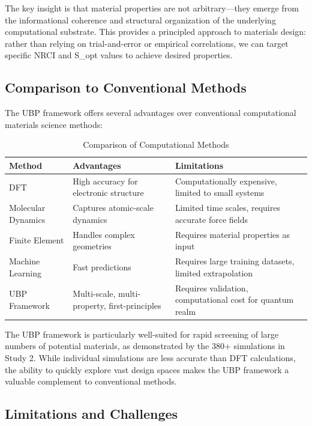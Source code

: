 \documentclass[11pt,a4paper]{article}
\begin{document}
The key insight is that material properties are not arbitrary—they emerge from the informational coherence and structural organization of the underlying computational substrate. This provides a principled approach to materials design: rather than relying on trial-and-error or empirical correlations, we can target specific NRCI and S\_opt values to achieve desired properties.

\subsection{Comparison to Conventional Methods}

The UBP framework offers several advantages over conventional computational materials science methods:

\begin{table}[H]
\centering
\caption{Comparison of Computational Methods}
\begin{tabular}{lp{3.5cm}p{3.5cm}}
\toprule
\textbf{Method} & \textbf{Advantages} & \textbf{Limitations} \\
\midrule
DFT & High accuracy for electronic structure & Computationally expensive, limited to small systems \\
Molecular Dynamics & Captures atomic-scale dynamics & Limited time scales, requires accurate force fields \\
Finite Element & Handles complex geometries & Requires material properties as input \\
Machine Learning & Fast predictions & Requires large training datasets, limited extrapolation \\
UBP Framework & Multi-scale, multi-property, first-principles & Requires validation, computational cost for quantum realm \\
\bottomrule
\end{tabular}
\end{table}

The UBP framework is particularly well-suited for rapid screening of large numbers of potential materials, as demonstrated by the 380+ simulations in Study 2. While individual simulations are less accurate than DFT calculations, the ability to quickly explore vast design spaces makes the UBP framework a valuable complement to conventional methods.

\subsection{Limitations and Challenges}
\end{document}
